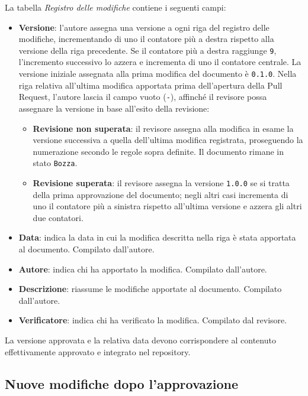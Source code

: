 \documentclass[11pt, a4paper]{article}
\begin{document}
La tabella \textit{Registro delle modifiche} contiene i seguenti campi:
\begin{itemize}
    \item \textbf{Versione}: l'autore assegna una versione a ogni riga del registro delle modifiche, incrementando di uno il contatore più a destra rispetto alla versione della riga precedente. Se il contatore più a destra raggiunge \texttt{9}, l'incremento successivo lo azzera e incrementa di uno il contatore centrale. La versione iniziale assegnata alla prima modifica del documento è \texttt{0.1.0}. Nella riga relativa all'ultima modifica apportata prima dell'apertura della Pull Request, l'autore lascia il campo vuoto (\texttt{-}), affinché il revisore possa assegnare la versione in base all'esito della revisione:
    \begin{itemize}
        \item \textbf{Revisione non superata}: il revisore assegna alla modifica in esame la versione successiva a quella dell'ultima modifica registrata, proseguendo la numerazione secondo le regole sopra definite. Il documento rimane in stato \texttt{Bozza}.
        \item \textbf{Revisione superata}: il revisore assegna la versione \texttt{1.0.0} se si tratta della prima approvazione del documento; negli altri casi incrementa di uno il contatore più a sinistra rispetto all'ultima versione e azzera gli altri due contatori.
    \end{itemize}
    \item \textbf{Data}: indica la data in cui la modifica descritta nella riga è stata apportata al documento. Compilato dall'autore.
    \item \textbf{Autore}: indica chi ha apportato la modifica. Compilato dall'autore.
    \item \textbf{Descrizione}: riassume le modifiche apportate al documento. Compilato dall'autore.
    \item \textbf{Verificatore}: indica chi ha verificato la modifica. Compilato dal revisore.
\end{itemize}

\noindent La versione approvata e la relativa data devono corrispondere al contenuto effettivamente approvato e integrato nel repository.

\subsection{Nuove modifiche dopo l'approvazione}
\end{document}
